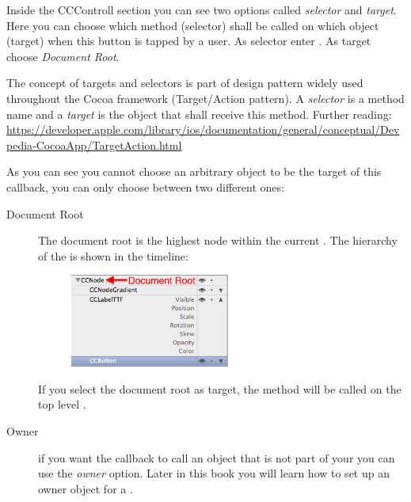Inside the CCControll section you can see two options called \textit{selector}
and \textit{target}. Here you can choose which method (selector) shall be
called on which object (target) when this button is tapped by a user. As
selector enter . As target choose \textit{Document Root}.

\begin{details}[frametitle={Targets and Selectors}] 
The concept of targets and selectors is part of design pattern widely used
throughout the Cocoa framework (Target/Action pattern). A \textit{selector} is
a method name and a \textit{target} is the object that shall receive this method.
Further reading:
\url{https://developer.apple.com/library/ios/documentation/general/conceptual/Devpedia-CocoaApp/TargetAction.html}
\end{details}

As you can see you cannot choose an arbitrary object to be the target of this
callback, you can only choose between two different ones:
\begin{description}
\item[Document Root] The document root is the highest node
within the current \ccbfile{}. The hierarchy of the \ccbfile{} is shown in the
\SB{} timeline: \begin{figure}[H]
		\centering
		\includegraphics[width=150pt]{images/firstproject/documentroot_node.png}
\end{figure}
If you select the document root as target, the  method
will be called on the top level \ccnode{}. 
\item[Owner] if you want the callback to call an object that is not part of your
\ccbfile{} you can use the \textit{owner} option. Later in this book you will
learn how to set up an owner object for a \ccbfile{}.
\end{description}

